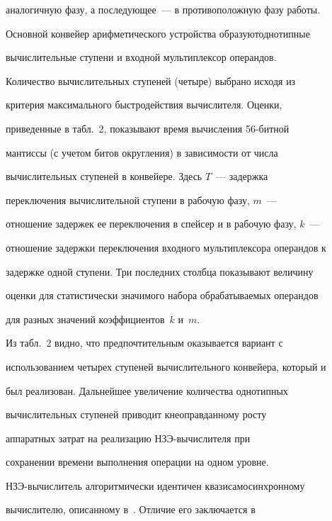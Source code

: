 аналогичную фазу, а последующее~--- в противоположную фазу работы.





   Основной конвейер арифметического устройства образуют\linebreak  однотипные


вычислительные ступени и входной мультиплексор операндов.


Количество вычислительных ступеней (четыре) выбрано исходя из


критерия максимального быстродействия вычислителя. Оценки,


приведенные в табл.~2, показывают время вычисления 56-бит\-ной


мантиссы (с учетом битов округления) в зависимости от числа


вычислительных ступеней в конвейере. Здесь $T$~--- задержка


переключения вычислительной ступени в рабочую фазу, $m$~---


отношение задержек ее переключения в спейсер и в рабочую фазу, $k$~---


отношение задержки переключения входного мультиплексора операндов к


задержке одной ступени. Три последних столбца показывают величину


оценки для статистически значимого набора обрабатываемых операндов


для разных значений коэффициентов~$k$ и~$m$.





   Из табл.~2 видно, что предпочтительным оказывается вариант с


использованием четырех ступеней вычислительного конвейера, который и


был реализован. Дальнейшее увеличение количества однотипных


вычислительных ступеней приводит к\linebreak неоправданному росту


аппаратных затрат на реализацию НЗЭ-вы\-чис\-ли\-те\-ля при


сохранении времени выполнения операции на одном уровне.





   НЗЭ-вычислитель алгоритмически идентичен квазисамосинхронному


вычислителю, описанному в~\cite{9-1}. Отличие его заключается в


